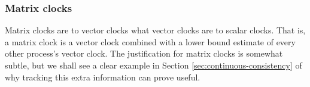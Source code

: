 \documentclass[]             %
{NASA}                       %
\theoremstyle{definition}
\begin{document}





  



\subsubsection{Matrix clocks}

Matrix clocks are to vector clocks what vector clocks are to scalar
clocks. That is, a matrix clock is a vector clock combined with a
lower bound estimate of every other process's vector clock. The
justification for matrix clocks is somewhat subtle, but we shall see a
clear example in Section \ref{sec:continuous-consistency} of why
tracking this extra information can prove useful.
\end{document}

